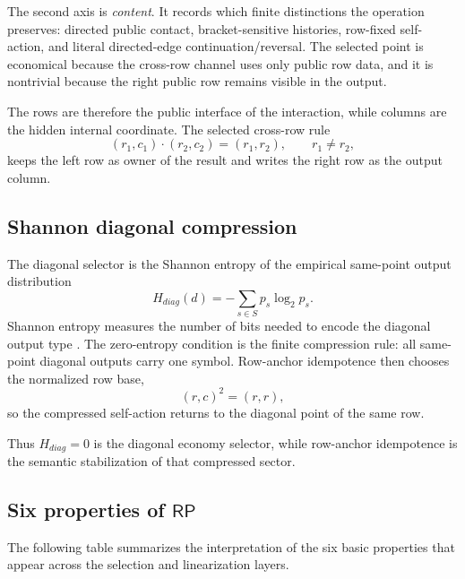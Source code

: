 \documentclass[11pt]{article}
\theoremstyle{definition}
\newcommand{\RP}{\mathsf{RP}}
\begin{document}
The second axis is \emph{content}.  It records which finite distinctions the
operation preserves: directed public contact, bracket-sensitive histories,
row-fixed self-action, and literal directed-edge continuation/reversal.  The
selected point is economical because the cross-row channel uses only public
row data, and it is nontrivial because the right public row remains visible
in the output.

The rows are therefore the public interface of the interaction, while columns
are the hidden internal coordinate.  The selected cross-row rule
\[
(r_1,c_1)\cdot(r_2,c_2)=(r_1,r_2),
\qquad r_1\ne r_2,
\]
keeps the left row as owner of the result and writes the right row as the
output column.

\subsection{Shannon diagonal compression}\label{shannon-diagonal-compression}

The diagonal selector is the Shannon entropy of the empirical same-point
output distribution
\[
H_{diag}(d)=-\sum_{s\in S}p_s\log_2 p_s.
\]
Shannon entropy measures the number of bits needed to encode the diagonal
output type \cite{Shannon1948,CoverThomas2006}.  The zero-entropy condition
is the finite compression rule: all same-point diagonal outputs carry one
symbol.  Row-anchor idempotence then chooses the normalized row base,
\[
(r,c)^2=(r,r),
\]
so the compressed self-action returns to the diagonal point of the same row.

Thus \(H_{diag}=0\) is the diagonal economy selector, while row-anchor
idempotence is the semantic stabilization of that compressed sector.

\subsection{Six properties of \texorpdfstring{\(\RP\)}{RP}}\label{six-properties-of-rp}

The following table summarizes the interpretation of the six basic properties
that appear across the selection and linearization layers.
\end{document}
